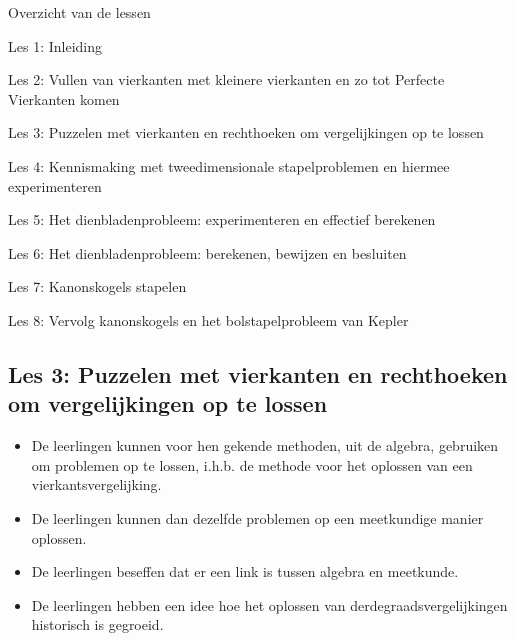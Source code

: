 \documentclass[dutch]{beamer}
\begin{document}


\begin{frame}
{Overzicht van de lessen}
\begin{list}{\quad}{}
\item Les 1: Inleiding
\item Les 2: Vullen van vierkanten met kleinere vierkanten en zo tot Perfecte Vierkanten komen
\item {\color{blue}Les 3: Puzzelen met vierkanten en rechthoeken om vergelijkingen op te lossen}
\item Les 4: Kennismaking met tweedimensionale stapelproblemen en hiermee experimenteren
\item Les 5: Het dienbladenprobleem: experimenteren en effectief berekenen
\item Les 6: Het dienbladenprobleem: berekenen, bewijzen en besluiten
\item Les 7: Kanonskogels stapelen
\item Les 8: Vervolg kanonskogels en het bolstapelprobleem van Kepler
\end{list}
\end{frame}

\subsection{Les 3: Puzzelen met vierkanten en rechthoeken om vergelijkingen op te lossen}

\begin{frame}
\begin{itemize}
  \item De leerlingen kunnen voor hen gekende methoden, uit de algebra, gebruiken om problemen op te lossen, i.h.b. de methode voor het oplossen van een vierkantsvergelijking.
  \item De leerlingen kunnen dan dezelfde problemen op een meetkundige manier oplossen.
  \item De leerlingen beseffen dat er een link is tussen algebra en meetkunde.
  \item De leerlingen hebben een idee hoe het oplossen van derdegraadsvergelijkingen historisch is gegroeid.
\end{itemize}
\end{frame}
\end{document}
